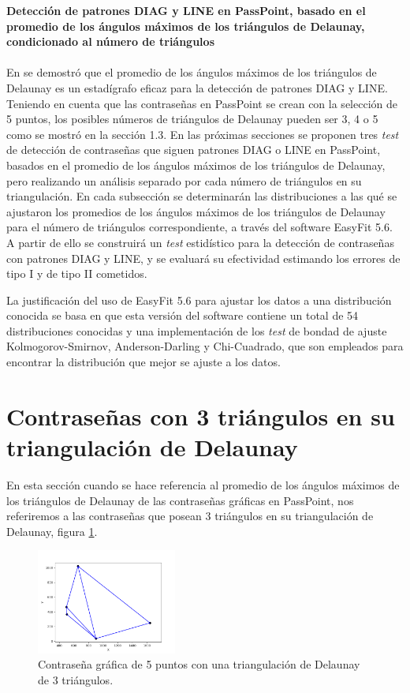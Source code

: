 \documentclass[12pt]{report}
\begin{document}
\vspace{-2em} %

\noindent\textbf{\LARGE Detección de patrones DIAG y LINE en PassPoint, basado en el promedio de los ángulos máximos de los triángulos de Delaunay, condicionado al número de triángulos}\\
\vspace{2em}
\\	
En \cite{13} se demostró que el promedio de los ángulos máximos de los triángulos de Delaunay es un estadígrafo eficaz para la detección de patrones DIAG y LINE. Teniendo en cuenta que las contraseñas en PassPoint se crean con la selección de 5 puntos, los posibles números de triángulos de Delaunay pueden ser 3, 4 o 5 como se mostró en la sección 1.3. En las próximas secciones se proponen tres \textit{test} de detección de contraseñas  que siguen patrones DIAG o LINE en PassPoint, basados en el promedio de los ángulos  máximos de los triángulos de Delaunay, pero  realizando un análisis separado por cada número de triángulos en su triangulación.
En cada subsección se determinarán las distribuciones a las qué se ajustaron los promedios de los ángulos máximos de los triángulos de Delaunay para el número de triángulos correspondiente, a través  del software EasyFit 5.6. A partir de ello se construirá un \textit{test} estidístico para la detección de contraseñas con patrones DIAG y LINE, y se evaluará su efectividad estimando los errores de  tipo I y de tipo II cometidos.

La justificación del uso de EasyFit 5.6 para ajustar los datos a una distribución conocida se basa en que esta versión del software contiene un total de 54 distribuciones conocidas y una implementación de los \textit{test} de bondad de ajuste Kolmogorov-Smirnov, Anderson-Darling y Chi-Cuadrado, que son empleados para encontrar la distribución que mejor se ajuste a los datos.


\setcounter{section}{0}
\section{Contraseñas con 3 triángulos en su triangulación de Delaunay }
En esta sección cuando se hace referencia  al promedio de los ángulos máximos de los triángulos de Delaunay  de las contraseñas gráficas en PassPoint, nos referiremos a las contraseñas que posean 3 triángulos en su triangulación de Delaunay, figura \ref{3TD}.
\newpage
	\begin{figure}[ht]
	\centering
	
	\includegraphics[width=0.41\textwidth]{alea3td.png}
	\caption{Contraseña gráfica de 5 puntos con una triangulación de Delaunay de 3 triángulos.}
	\label{3TD}
\end{figure}
\end{document}
